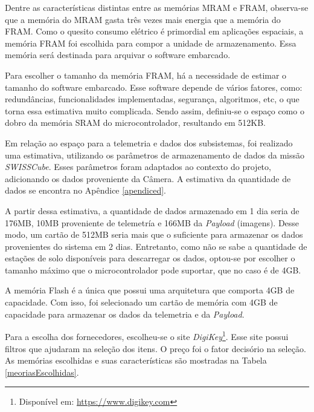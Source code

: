 Dentre as características distintas entre as memórias MRAM e FRAM, observa-se que a memória do MRAM gasta três vezes mais energia que a memória do FRAM. Como o quesito consumo elétrico é primordial em aplicações espaciais, a memória FRAM foi escolhida para compor a unidade de armazenamento. Essa memória será destinada para arquivar o software embarcado.

Para escolher o tamanho da memória FRAM, há a necessidade de estimar o tamanho do software embarcado. Esse software depende de vários fatores, como: redundâncias, funcionalidades implementadas, segurança, algoritmos, etc, o que torna essa estimativa muito complicada. Sendo assim, definiu-se o espaço como o dobro da memória SRAM do microcontrolador,  resultando em 512KB.

Em relação ao espaço para a telemetria e dados dos subsistemas, foi realizado uma estimativa, utilizando os parâmetros de armazenamento de dados da missão \textit{SWISSCube}. Esses parâmetros foram adaptados ao contexto do projeto, adicionando os dados proveniente da Câmera. A estimativa da quantidade de dados se encontra no Apêndice \ref{apendiced}.

A partir dessa estimativa, a quantidade de dados armazenado em 1 dia seria de 176MB, 10MB proveniente de telemetría e 166MB da \textit{Payload} (imagens). Desse modo, um cartão de 512MB seria mais que o suficiente para armazenar os dados provenientes do sistema em 2 dias. Entretanto, como não se sabe a quantidade de estações de solo disponíveis para descarregar os dados, optou-se por escolher o tamanho máximo que o microcontrolador pode suportar, que no caso é de 4GB.

A memória Flash é a única que possui uma arquitetura que comporta 4GB de capacidade. Com isso, foi selecionado um cartão de memória com 4GB de capacidade para armazenar os dados da telemetria e da \textit{Payload}. 

Para a escolha dos fornecedores, escolheu-se o site \textit{DigiKey}\footnote{Disponível em: \url{https://www.digikey.com}}. Esse site possui filtros que ajudaram na seleção dos itens. O preço foi o fator decisório na seleção. As memórias escolhidas e suas características são mostradas na Tabela \ref{meoriasEscolhidas}.

\begin{table}[h]
\centering
\caption{Especificação das memórias da Unidade de Armazenamento.}
\label{meoriasEscolhidas}
\end{table}

